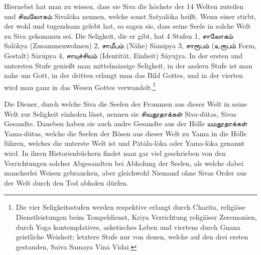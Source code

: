 \documentclass{article}
\newcommand{\TamilText}[1]{\texttamil{#1}}
\newcommand{\tam}[1]{\TamilText{#1}}
\begin{document}
Hiernebst hat man zu wissen, dass sie Siva die höchste der 14 Welten zuteilen und \tam{சிவலோகம்} Sival\={o}ka nennen, welche sonst Satyal\={o}ka heißt. Wenn einer stirbt, der wohl und tugendsam gelebt hat, so sagen sie, dass seine Seele in solche Welt zu Siva gekommen sei. Die Seligkeit, die er gibt, hat 4 Stufen 1, \tam{சாலோகம்} Sal\={o}kya (Zusammenwohnen) 2, \tam{சாமீபம்} (Nähe) S\={a}m\={i}pya 3, \tam{சாரூபம்} (\tam{உரூபம்} Form, Gestalt) S\={a}r\={u}pya 4, \tam{சாயுச்சியம்} (Identität, Einheit) S\={a}yujya. In der ersten und untersten Stufe genießt man mittelmässige Seligkeit, in der andern Stufe ist man nahe um Gott, in der dritten erlangt man das Bild Gottes, und in der vierten wird man ganz in das Wesen Gottes verwandelt.\footnote{Die vier Seligkeitsstufen werden respektive erlangt durch Charita, religiöse Dienstleistungen beim Tempeldienst, Kriya Verrichtung religiöser Zeremonien, durch Yoga kontemplatives, asketisches Leben und viertens durch Gnana geistliche Weisheit; letztere Stufe nur von denen, welche auf den drei ersten gestanden, Saiva Samaya Vin\={a} Vidai.}

Die Diener, durch welche Siva die Seelen der Frommen aus dieser Welt in seine Welt zur Seligkeit einholen lässt, nennen sie \tam{சிவதூதாக்கள்} Siva-d\={u}tas, Sivas Gesandte. Daneben haben sie auch andre Gesandte aus der Hölle \tam{யமதூதாக்கள்} Yama-d\={u}tas, welche die Seelen der Bösen aus dieser Welt zu Yama in die Hölle führen, welches die unterste Welt ist und P\={a}t\={a}la-l\={o}ka oder Yama-l\={o}ka genannt wird. In ihren Historienbüchern findet man gar viel geschrieben von den Verrichtungen solcher Abgesandten bei Abholung der Seelen, als welche dabei mancherlei Weisen gebrauchen, aber gleichwohl Niemand ohne Sivas Order aus der Welt durch den Tod abholen dürfen.
\end{document}

